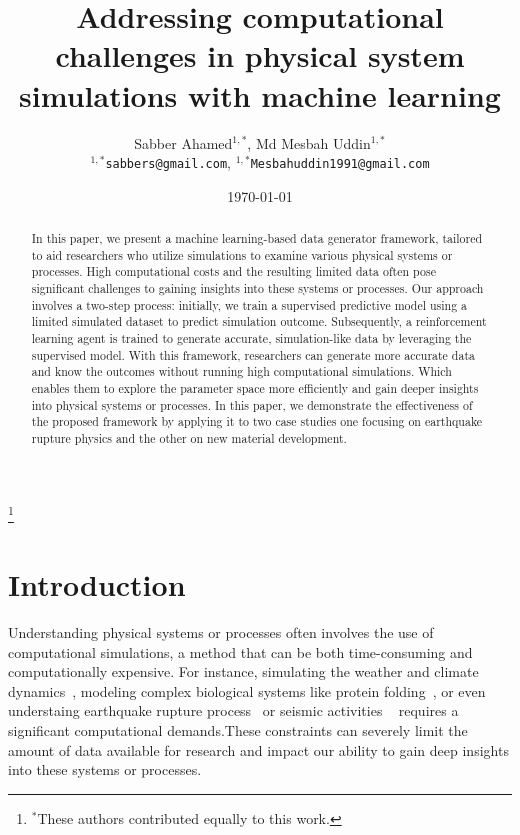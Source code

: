 \documentclass{article}
\title{Addressing computational challenges in physical system simulations with machine learning}
\author{
    Sabber Ahamed$^{1,*}$, Md Mesbah Uddin$^{1,*}$ \\
    \texttt{$^{1,*}$sabbers@gmail.com}, \texttt{$^{1,*}$Mesbahuddin1991@gmail.com} \\
}
\date{\today}
\begin{document}
\maketitle
\let\thefootnote\relax\footnote{{$^*$}These authors contributed equally to this work.}


\begin{abstract}
    \noindent In this paper, we present a machine learning-based data generator framework, tailored to aid researchers who utilize simulations to examine various physical systems or processes. High computational costs and the resulting limited data often pose significant challenges to gaining insights into these systems or processes. Our approach involves a two-step process: initially, we train a supervised predictive model using a limited simulated dataset to predict simulation outcome. Subsequently, a reinforcement learning agent is trained to generate accurate, simulation-like data by leveraging the supervised model. With this framework, researchers can generate more accurate data and know the outcomes without running high computational simulations. Which enables them to explore the parameter space more efficiently and gain deeper insights into physical systems or processes. In this paper, we demonstrate the effectiveness of the proposed framework by applying it to two case studies
    one focusing on earthquake rupture physics and the other on new material development.
\end{abstract}

\maketitle

\section{Introduction}

Understanding physical systems or processes often involves the use of computational simulations, a method that can be both time-consuming and computationally expensive. For instance, simulating the weather and climate dynamics~\citep{washington2005introduction}, modeling complex biological systems like protein folding~\citep{shaw2010atomic}, or even understaing earthquake rupture process~\citep{harris2018suite} or seismic activities ~\citep{graves2011cybershake, shaw2018physics} requires a significant computational demands.These constraints can severely limit the amount of data available for research and impact our ability to gain deep insights into these systems or processes.
\end{document}
